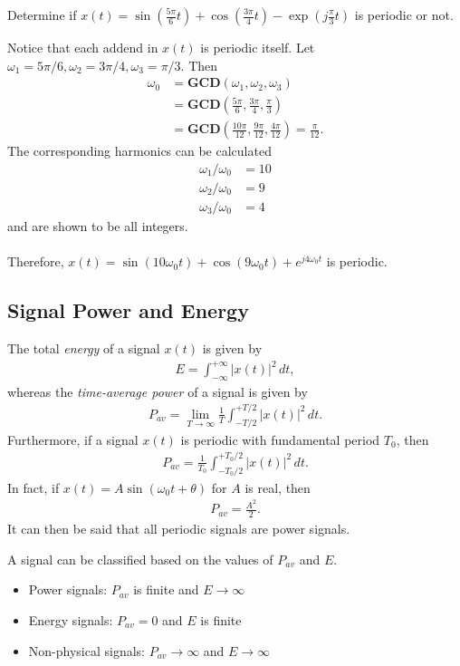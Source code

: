 \documentclass{report}
\begin{document}
\begin{example}
    Determine if $x(t)=\sin(\frac{5\pi}{6}t)+\cos(\frac{3\pi}{4}t)-\exp\left(j\frac{\pi}{3}t\right)$ is periodic or not.
\end{example}
\begin{solution}
Notice that each addend in $x(t)$ is periodic itself. Let $\omega_1=5\pi/6, \omega_2=3\pi/4, \omega_3=\pi/3$. Then
\begin{align*}
    \omega_0 &= \mathbf{GCD}(\omega_1,\omega_2,\omega_3) \\
    &= \mathbf{GCD}\left(\frac{5\pi}{6}, \frac{3\pi}{4}, \frac{\pi}{3}\right) \\
    &= \mathbf{GCD}\left(\frac{10\pi}{12}, \frac{9\pi}{12}, \frac{4\pi}{12}\right) = \frac{\pi}{12}.
\end{align*}
The corresponding harmonics can be calculated
\begin{align*}
    \omega_1/\omega_0 &= 10 \\
    \omega_2/\omega_0 &= 9 \\
    \omega_3/\omega_0 &= 4
\end{align*}
and are shown to be all integers. \\ \\
Therefore, $x(t)=\sin(10\omega_0 t)+\cos(9\omega_0 t)+e^{j4\omega_0 t}$ is periodic.
\end{solution}

\subsection{Signal Power and Energy}
The total \emph{energy} of a signal $x(t)$ is given by 
\begin{align}
    E = \int_{-\infty}^{+\infty} |x(t)|^2 \,dt,
\end{align}
whereas the \emph{time-average power} of a signal is given by
\begin{align}
    P_{av} = \lim_{T\rightarrow \infty} \frac{1}{T}\int_{-T/2}^{+T/2} |x(t)|^2 \,dt.
\end{align}
Furthermore, if a signal $x(t)$ is periodic with fundamental period $T_0$, then 
\begin{align}
    P_{av} = \frac{1}{T_0}\int_{-T_0/2}^{+T_0/2} |x(t)|^2 \,dt.
\end{align}
In fact, if $x(t)=A\sin(\omega_0 t+\theta)$ for $A$ is real, then 
\begin{align}
    P_{av} = \frac{A^2}{2}.
\end{align}
It can then be said that all periodic signals are power signals.
\begin{tcolorbox}[width=\textwidth,colback={white}, sharp corners]
    A signal can be classified based on the values of $P_{av}$ and $E$.
    \begin{itemize}
        \item Power signals: $P_{av}$ is finite and $E\rightarrow \infty$ 
        \item Energy signals: $P_{av}=0$ and $E$ is finite
        \item Non-physical signals: $P_{av}\rightarrow \infty$ and $E\rightarrow \infty$ 
    \end{itemize}
\end{tcolorbox}
\end{document}
